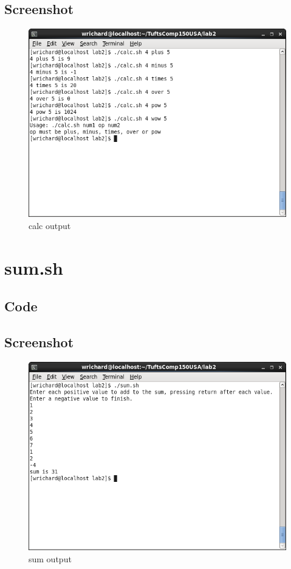 \documentclass[a4paper,10pt]{article}
\begin{document}
\subsection{Screenshot}
\begin{figure}[H]
 \centering
 \includegraphics[width=\linewidth]{./calc.png}
 \caption{calc output}
 \label{fig:myps}
\end{figure}

\section{sum.sh}

\subsection{Code}


\subsection{Screenshot}
\begin{figure}[H]
 \centering
 \includegraphics[width=\linewidth]{./sum.png}
 \caption{sum output}
 \label{fig:myps}
\end{figure}
\end{document}
